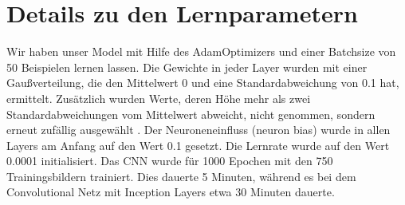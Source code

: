 \documentclass[runningheads,a4paper]{llncs}[2015/06/24]
\begin{document}
\section{Details zu den Lernparametern}
Wir haben unser Model mit Hilfe des AdamOptimizers und einer Batchsize von 50 Beispielen lernen lassen. Die Gewichte in jeder Layer wurden mit einer Gaußverteilung, die den Mittelwert 0 und eine Standardabweichung von 0.1 hat, ermittelt. Zusätzlich wurden Werte, deren Höhe mehr als zwei Standardabweichungen vom Mittelwert abweicht, nicht genommen, sondern erneut zufällig ausgewählt \cite{tensorflow}. Der Neuroneneinfluss (neuron bias) wurde in allen Layers am Anfang auf den Wert 0.1 gesetzt. Die Lernrate 
wurde auf den Wert
0.0001 initialisiert. Das CNN wurde für 1000 Epochen mit den 750 Trainingsbildern trainiert. Dies dauerte 5 Minuten, während es bei dem Convolutional Netz mit Inception Layers etwa 30 Minuten dauerte. 
\end{document}

